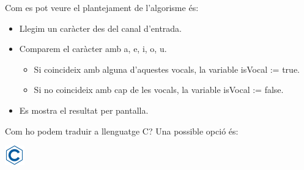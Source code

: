 \documentclass[]{book}
\newenvironment{Shaded}{\begin{snugshade}}{\end{snugshade}}
\newcommand{\DataTypeTok}[1]{\textcolor[rgb]{0.13,0.29,0.53}{#1}}
\newcommand{\DecValTok}[1]{\textcolor[rgb]{0.00,0.00,0.81}{#1}}
\newcommand{\CharTok}[1]{\textcolor[rgb]{0.31,0.60,0.02}{#1}}
\newcommand{\SpecialCharTok}[1]{\textcolor[rgb]{0.00,0.00,0.00}{#1}}
\newcommand{\StringTok}[1]{\textcolor[rgb]{0.31,0.60,0.02}{#1}}
\newcommand{\ImportTok}[1]{#1}
\newcommand{\CommentTok}[1]{\textcolor[rgb]{0.56,0.35,0.01}{\textit{#1}}}
\newcommand{\ControlFlowTok}[1]{\textcolor[rgb]{0.13,0.29,0.53}{\textbf{#1}}}
\newcommand{\PreprocessorTok}[1]{\textcolor[rgb]{0.56,0.35,0.01}{\textit{#1}}}
\newcommand{\NormalTok}[1]{#1}
\providecommand{\tightlist}{%
  \setlength{\itemsep}{0pt}\setlength{\parskip}{0pt}}
\begin{document}
Com es pot veure el plantejament de l'algorisme és:

\begin{itemize}
\tightlist
\item
  Llegim un caràcter des del canal d'entrada.
\item
  Comparem el caràcter amb a, e, i, o, u.

  \begin{itemize}
  \tightlist
  \item
    Si coincideix amb alguna d'aquestes vocals, la variable isVocal :=
    true.
  \item
    Si no coincideix amb cap de les vocals, la variable isVocal :=
    false.
  \end{itemize}
\item
  Es mostra el resultat per pantalla.
\end{itemize}

Com ho podem traduir a llenguatge C? Una possible opció és:

\includegraphics{./img/c.png}

\begin{Shaded}
\end{Shaded}
\end{document}
